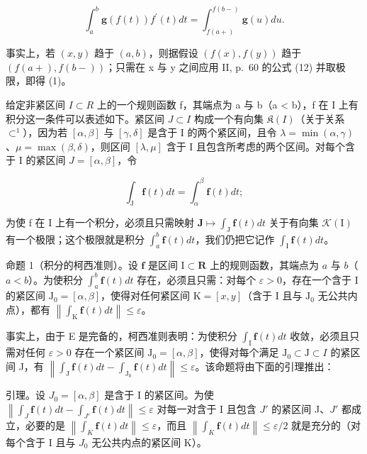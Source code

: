 \[
\int_ {a} ^ {b} \mathbf {g} (f (t)) f ^ {\prime} (t) d t = \int_ {f (a +)} ^ {f (b -)} \mathbf {g} (u) d u.\tag{1}
\]

事实上，若 \((x, y)\) 趋于 \((a, b)\)，则据假设 \((f(x), f(y))\) 趋于 \((f(a+), f(b-))\)；只需在 x 与 y 之间应用 II, p.~60 的公式 (12) 并取极限，即得 (1)。

给定非紧区间 \(I \subset R\) 上的一个规则函数 f，其端点为 a 与 b（a \textless{} b），f 在 I 上有积分这一条件可以表述如下。紧区间 \(J \subset I\) 构成一个有向集 \(\mathfrak{K}(I)\)（关于关系 \(\subset^{1}\)），因为若 \([\alpha, \beta]\) 与 \([\gamma, \delta]\) 是含于 I 的两个紧区间，且令 \(\lambda = \min(\alpha, \gamma)\)、\(\mu = \max(\beta, \delta)\)，则区间 \([\lambda, \mu]\) 含于 I 且包含所考虑的两个区间。对每个含于 I 的紧区间 \(J = [\alpha, \beta]\)，令

\[
\int_ {\mathrm{J}} \mathbf {f} (t) d t = \int_ {\alpha} ^ {\beta} \mathbf {f} (t) d t;
\]

为使 f 在 I 上有一个积分，必须且只需映射 \(\mathbf{J} \mapsto \int_{\mathrm{J}} \mathbf{f}(t) dt\) 关于有向集 \(\mathcal{K}(\mathrm{I})\) 有一个极限；这个极限就是积分 \(\int_{a}^{b} \mathbf{f}(t) dt\)，我们仍把它记作 \(\int_{\mathrm{I}} \mathbf{f}(t) dt\)。

命题 1（积分的柯西准则）。设 \(\mathbf{f}\) 是区间 \(\mathrm{I} \subset \mathbf{R}\) 上的规则函数，其端点为 \(a\) 与 \(b\)（\(a < b\)）。为使积分 \(\int_{a}^{b} \mathbf{f}(t) dt\) 存在，必须且只需：对每个 \(\varepsilon > 0\)，存在一个含于 I 的紧区间 \(\mathrm{J}_0 = [\alpha, \beta]\)，使得对任何紧区间 \(\mathrm{K} = [x, y]\)（含于 I 且与 \(\mathrm{J}_0\) 无公共内点），都有 \(\left\| \int_{\mathrm{K}} \mathbf{f}(t) dt \right\| \leqslant \varepsilon\)。

事实上，由于 E 是完备的，柯西准则表明：为使积分 \(\int_{\mathrm{I}} \mathbf{f}(t) dt\) 收敛，必须且只需对任何 \(\varepsilon > 0\) 存在一个紧区间 \(\mathrm{J}_0 = [\alpha, \beta]\)，使得对每个满足 \(\mathrm{J}_0 \subset \mathrm{J} \subset I\) 的紧区间 J，有 \(\left\| \int_{\mathrm{J}} \mathbf{f}(t) dt - \int_{\mathrm{J}_0} \mathbf{f}(t) dt \right\| \leqslant \varepsilon\)。该命题将由下面的引理推出：

引理。设 \(J_{0} = [\alpha, \beta]\) 是含于 I 的紧区间。为使 \(\left\|\int_{J} \mathbf{f}(t) dt - \int_{J'} \mathbf{f}(t) dt\right\| \leqslant \varepsilon\) 对每一对含于 I 且包含 \(J'\) 的紧区间 J、\(J'\) 都成立，必要的是 \(\left\|\int_{K} \mathbf{f}(t) dt\right\| \leqslant \varepsilon\)，而且 \(\left\|\int_{K} \mathbf{f}(t) dt\right\| \leqslant \varepsilon/2\) 就是充分的（对每个含于 I 且与 \(J_{0}\) 无公共内点的紧区间 K）。

